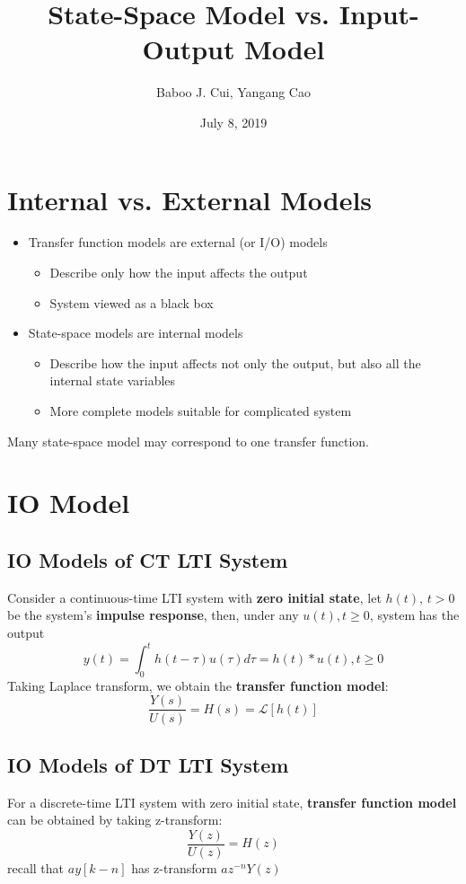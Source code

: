 \documentclass[10pt,a4paper,oneside]{article}
\date{July 8, 2019}
\author{Baboo J. Cui, Yangang Cao}
\title{State-Space Model vs. Input-Output Model}
\begin{document}
\maketitle
\tableofcontents
\newpage

\section{Internal vs. External Models}
\begin{itemize}
	\item Transfer function models are external (or I/O) models
	\begin{itemize}
		\item Describe only how the input affects the output
		\item System viewed as a black box
	\end{itemize}
	\item State-space models are internal models
	\begin{itemize}
		\item Describe how the input affects not only the output, but also all the internal state variables
		\item More complete models suitable for complicated system
	\end{itemize}
\end{itemize}
Many state-space model may correspond to one transfer function.

\section{IO Model}
\subsection{IO Models of CT LTI System}
Consider a continuous-time LTI system with \textbf{zero initial state}, let $h(t)$, $t>0$ be the system's \textbf{impulse response}, then, under any $u(t) , t\geq0$, system has the output
\[
y(t)=\int_{0}^{t}h(t-\tau)u(\tau)d\tau=h(t)*u(t), t\geq0
\]
Taking Laplace transform, we obtain the\textbf{ transfer function model}:
\[
\frac{Y(s)}{U(s)}=H(s)=\mathcal{L}[h(t)]
\]

\subsection{IO Models of DT LTI System}
For a discrete-time LTI system with zero initial state, \textbf{transfer function model} can be obtained by taking z-transform:
\[
\frac{Y(z)}{U(z)}=H(z)
\]
recall that $ay[k-n]$ has z-transform $az^{-n}Y(z)$
\end{document}
